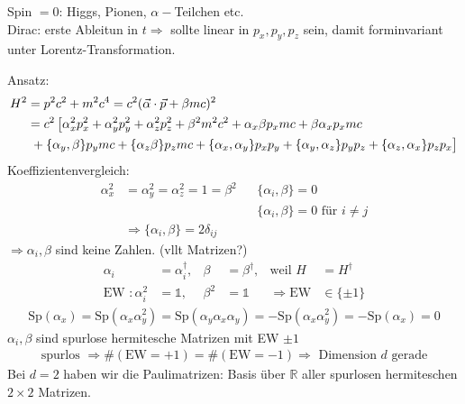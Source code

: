 Spin $=0$: Higgs, Pionen, $\alpha-$Teilchen etc.
\\
Dirac: erste Ableitun in $t \Rightarrow$ sollte linear in $p_x, p_y, p_z$ sein, damit forminvariant unter Lorentz-Transformation.

Ansatz:
	\begin{align*}
		H^2 &= p^2 c^2 + m^2 c^4 = c^2 (\vec{\alpha} \cdot \vec{p} + \beta m c)^2\\
		&= c^2 
		\left[
			\alpha_x^2 p_x^2 + \alpha_y^2 p_y^2 +\alpha_z^2 p_z^2
			+ \beta^2m^2c^2 + \alpha_x \beta p_x m c + \beta \alpha_x p_x mc \right.\\
			&\left.\vphantom{\alpha_x^2 p_x^2} + \{\alpha_y, \beta\} p_y mc + \{\alpha_z \beta \} p_z mc 
			+ \{\alpha_x, \alpha_y\} p_x p_y + \{\alpha_y, \alpha_z\} p_y p_z
			+\{\alpha_z, \alpha_x\}p_z p_x
 		\right]
	\end{align*}
Koeffizientenvergleich:
	\begin{align*}
		\alpha_x^2 &= \alpha_y^2 = \alpha_z^2 = 1 = \beta^2
		& &\boxed{\{\alpha_i, \beta \} = 0}\\
		& & &\{\alpha_i, \beta \} = 0 \text{ für } i \neq j \\
		&\Rightarrow \boxed{\{\alpha_i, \beta \} = 2 \delta_{ij}}
	\end{align*}
$\Rightarrow \alpha_i, \beta$ sind keine Zahlen. (vllt Matrizen?)
	\begin{align*}
		\alpha_i &= \alpha_i^\dagger ,&
		\beta &= \beta^\dagger ,& 
		\text{weil } H &= H^\dagger \\
		\text{EW }: \alpha_i^2 &= \mathds{1} ,&
		\beta^2 &= \mathds{1} 
		&\Rightarrow \mathrm{ EW } &\in \{\pm 1\}  
	\end{align*}
	\begin{align*}
		\mathrm{Sp}(\alpha_x) = \mathrm{Sp}(\alpha_x\alpha_y^2) 
		= \mathrm{Sp} (\alpha_y \alpha_x \alpha_y) 
		= - \mathrm{Sp}(\alpha_x \alpha_y^2) = -\mathrm{Sp}(\alpha_x) = 0
	\end{align*}
$\alpha_i, \beta$ sind spurlose hermitesche Matrizen mit EW $\pm 1$
	\begin{align*}
		\text{spurlos } \Rightarrow \# (\mathrm{EW } = + 1)
		= \# (\mathrm{EW } = - 1) \Rightarrow \text{ Dimension }d\text{ gerade}
	\end{align*}
Bei $d=2$ haben wir die Paulimatrizen: Basis über $\mathds{R}$ aller spurlosen hermiteschen $2 \times 2$ Matrizen.
